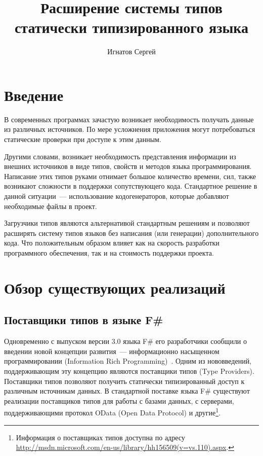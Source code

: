 \documentclass{article}
\title{Расширение системы типов статически типизированного языка}
\author{Игнатов Сергей}
\date{\rudate\formatdate{15}{11}{2011}}
\begin{document}
\maketitle

\section{Введение}

В современных программах зачастую возникает необходимость получать данные из различных источников.
По мере усложнения приложения могут потребоваться статические проверки при доступе к этим данным.

Другими словами, возникает необходимость представления информации из внешних источников в виде типов, свойств и методов языка программирования.
Написание этих типов руками отнимает большое количество времени, сил, также возникают сложности в поддержки сопутствующего кода.
Стандартное решение в данной ситуации~--- использование кодогенераторов, которые добавляют необходимые файлы в проект.

Загрузчики типов являются альтернативой стандартным решениям и позволяют расширять систему типов языков без написания (или генерации) дополнительного кода.
Что положительным образом влияет как на скорость разработки программного обеспечения, так и на стоимость поддержки проекта.

\section{Обзор существующих реализаций}

\subsection{Поставщики типов в языке F\#}
Одновременно с выпуском версии 3.0 языка F\# его разработчики сообщили о введении новой концепции развития~--- информационно насыщенном программировании (Information Rich Programming)~\cite{joepamer2011}.
Одним из нововведений, поддерживающим эту концепцию являются поставщики типов (Type Providers).
Поставщики типов позволяют получить статически типизированный доступ к различным источникам данных.
В стандартной поставке языка F\# существуют реализации поставщиков типов для работы с базами данных, с серверами, поддерживающими протокол OData (Open Data Protocol) и другие\footnote{Информация о поставщиках типов доступна по адресу \url{http://msdn.microsoft.com/en-us/library/hh156509(v=vs.110).aspx}.}.
\end{document}
